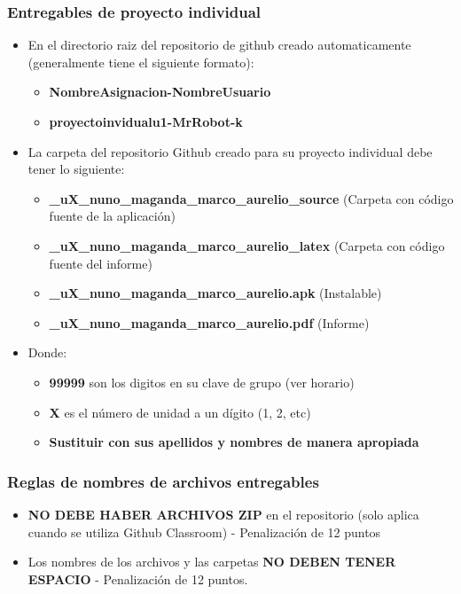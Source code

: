 \begin{frame}
\frametitle{Entregables de proyecto individual}
    \begin{itemize}
    \item En el directorio raiz del repositorio de github creado automaticamente (generalmente tiene el siguiente formato):
    \begin{itemize}
		\item \textbf{NombreAsignacion-NombreUsuario}
        \item \textbf{proyectoinvidualu1-MrRobot-k}
    \end{itemize}
    \item La carpeta del repositorio  Github creado para su proyecto individual debe tener lo siguiente:
        \begin{itemize}
        \item \textbf{\clavegrupo\_uX\_nuno\_maganda\_marco\_aurelio\_source} (Carpeta con c\'odigo fuente de la aplicaci\'on)
        \item \textbf{\clavegrupo\_uX\_nuno\_maganda\_marco\_aurelio\_latex} (Carpeta con c\'odigo fuente del informe)
        \item \textbf{\clavegrupo\_uX\_nuno\_maganda\_marco\_aurelio.apk} (Instalable)
        \item \textbf{\clavegrupo\_uX\_nuno\_maganda\_marco\_aurelio.pdf} (Informe)
        \end{itemize}
    \item Donde:
        \begin{itemize}
        \item \textbf{99999} son los digitos en su clave de grupo (ver horario)
        \item \textbf{X} es el n\'umero de unidad a un d\'igito (1, 2, etc)
        \item \textbf{Sustituir con sus apellidos y nombres de manera apropiada} 
        \end{itemize}
    \end{itemize}
\end{frame}

\begin{frame}
\frametitle{Reglas de nombres de archivos entregables}
\begin{itemize}
\item \textbf{NO DEBE HABER ARCHIVOS ZIP} en el repositorio (solo aplica cuando se utiliza Github Classroom) - Penalización de 12 puntos
\item Los nombres de los archivos y las carpetas \textbf{NO DEBEN TENER ESPACIO} - Penalización de 12 puntos. 
\end{itemize}
\end{frame}




